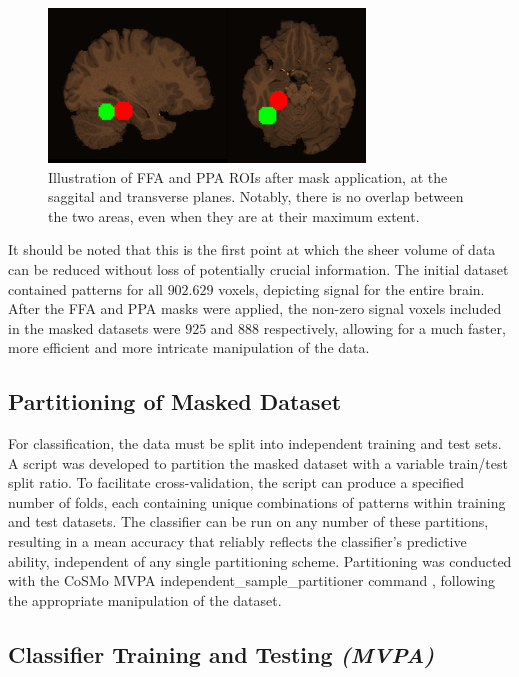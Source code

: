 \begin{figure}[htbp]
    \centering
    \includegraphics[width = 0.75\textwidth]{assets/images/masks_sag_trans.jpg}
    \caption[Illustration of FFA and PPA masks]{Illustration of \gls{FFA} and \gls{PPA} \gls{ROI}s after mask application, at the saggital and transverse planes. Notably, there is no overlap between the two areas, even when they are at their maximum extent.}
    \label{fig:radius}
\end{figure}

It should be noted that this is the first point at which the sheer volume of data can be reduced without loss of potentially crucial information. The initial dataset contained patterns for all $902.629$ voxels, depicting signal for the entire brain. After the \gls{FFA} and \gls{PPA} masks were applied, the non-zero signal voxels included in the masked datasets were $925$ and $888$ respectively, allowing for a much faster, more efficient and more intricate manipulation of the data.

\subsection{Partitioning of Masked Dataset}

For classification, the data must be split into independent training and test sets. A script was developed to partition the masked dataset with a variable train/test split ratio. To facilitate cross-validation, the script can produce a specified number of folds, each containing unique combinations of patterns within training and test datasets. The classifier can be run on any number of these partitions, resulting in a mean accuracy that reliably reflects the classifier's predictive ability, independent of any single partitioning scheme. Partitioning was conducted with the CoSMo \gls{MVPA} independent\_sample\_partitioner command \cite{cosmo1}, following the appropriate manipulation of the dataset.

\subsection{Classifier Training and Testing \textit{(MVPA)}}

